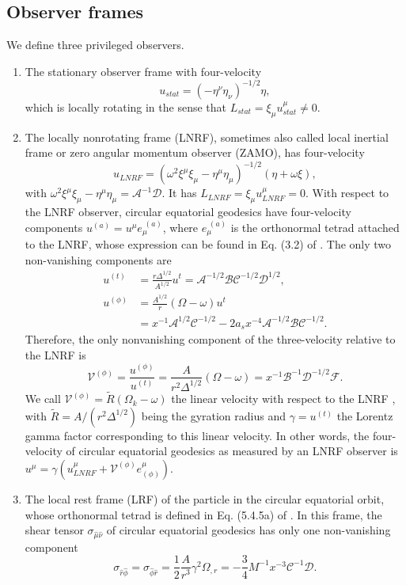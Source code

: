 \documentclass[a4paper,fleqn,usenatbib]{mnrasMOD}
\numberwithin{equation}{section}
\newcommand{\be}{\begin{equation}}
\newcommand{\ee}{\end{equation}}
\begin{document}
\subsection{Observer frames}
We define three privileged observers.
\begin{enumerate}
\item The stationary observer frame with four-velocity 
\be
u_{stat} = (- \eta^{\nu}\eta_{\nu})^{-1/2} \eta,
\ee 
which is locally rotating in the sense that $L_{stat} = \xi_{\mu} u_{stat}^{\mu} \neq 0$. 

\item The locally nonrotating frame (LNRF), sometimes also called local inertial frame or zero angular momentum observer (ZAMO), has four-velocity
\be
u_{LNRF} = ( \omega^{2}\xi^{\mu}\xi_{\mu} -\eta^{\mu}\eta_{\mu})^{-1/2} ( \eta + \omega \xi), 
\ee
with $\omega^{2}\xi^{\mu}\xi_{\mu} -\eta^{\mu} \eta_{\mu}= \mathcal{A}^{-1}\mathcal{D}$.
It has $L_{LNRF} =  \xi_{\mu} u_{LNRF}^{\mu} = 0$.
With respect to the LNRF observer, circular equatorial geodesics have four-velocity components $u^{(a)} = u^{\mu} e_{\mu}^{\; (a)}$, where $e_{\mu}^{\; (a)}$ is the orthonormal tetrad attached to the LNRF, whose expression can be found in Eq. (3.2) of \cite{Bardeen:1972fi}. The only two non-vanishing components are
\begin{align}
u^{(t)} &=  \frac{r \Delta^{1/2}}{A^{1/2}} u^{t}= \mathcal{A}^{-1/2} \mathcal{B}\mathcal{C}^{-1/2}\mathcal{D}^{1/2},\\
u^{(\phi)} &=\frac{A^{1/2}}{r}(\Omega -\omega) u^{t} \\ \nonumber
&=x^{-1} \mathcal{A}^{1/2}  \mathcal{C}^{-1/2} - 2 a_s x^{-4} \mathcal{A}^{-1/2}  \mathcal{B} \mathcal{C}^{-1/2}.
\end{align}
Therefore, the only nonvanishing component of the three-velocity relative to the LNRF is
\be 
\mathcal{V}^{(\phi)} = \frac{u^{(\phi)}}{u^{(t)}} =\frac{A}{r^2 \Delta^{1/2}}(\Omega - \omega) =  x^{-1} \mathcal{B}^{-1}\mathcal{D}^{-1/2} \mathcal{F}.
\ee
We call $\mathcal{V}^{(\phi)} = \tilde{R}(\Omega_k - \omega)$ the linear velocity with respect to the LNRF , with $ \tilde{R} = A/(r^2 \Delta^{1/2})$ being the gyration radius and $\gamma = u^{(t)}$ the Lorentz gamma factor corresponding to this linear velocity. In other words, the four-velocity of circular equatorial geodesics as measured by an LNRF observer is $u^{\mu} = \gamma (u_{LNRF}^{\mu} + \mathcal{V}^{(\phi)}e_{(\phi)}^{\mu})$.
\item The local rest frame (LRF) of the particle in the circular equatorial orbit, whose orthonormal tetrad is defined in Eq. (5.4.5a) of \cite{25334}.
In this frame, the shear tensor $\sigma_{\hat{\mu}\hat{\nu}}$ of circular equatorial geodesics has only one non-vanishing component 
\be \label{shear tensor}
\sigma_{\hat{r}\hat{\phi}} =\sigma_{\hat{\phi}\hat{r}} = \frac{1}{2} \frac{A}{r^3} \gamma^2 \Omega_{,r} = -\frac{3}{4}M^{-1} x^{-3}\mathcal{C}^{-1}\mathcal{D}.
\ee
\end{enumerate}
\end{document}
